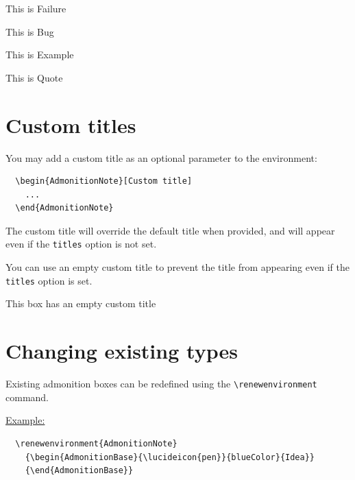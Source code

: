\documentclass{scrartcl}
\begin{document}
\begin{AdmonitionFailure}
This is Failure
\end{AdmonitionFailure}

\begin{AdmonitionBug}
This is Bug
\end{AdmonitionBug}

\begin{AdmonitionExample}
This is Example
\end{AdmonitionExample}

\begin{AdmonitionQuote}
This is Quote
\end{AdmonitionQuote}


\section{Custom titles}

You may add a custom title as an optional parameter to the environment:

\begin{verbatim}
  \begin{AdmonitionNote}[Custom title]
    ...
  \end{AdmonitionNote}
\end{verbatim}

The custom title will override the default title when provided, and will
appear even if the \texttt{titles} option is not set.

\begin{AdmonitionTip}[Tip]
You can use an empty custom title to prevent the title from appearing even if
the \texttt{titles} option is set.
\end{AdmonitionTip}

\begin{AdmonitionCaution}[]
This box has an empty custom title
\end{AdmonitionCaution}


\section{Changing existing types}

Existing admonition boxes can be redefined using the \verb|\renewenvironment|
command.

\underline{Example:}

\begin{verbatim}
  \renewenvironment{AdmonitionNote}
    {\begin{AdmonitionBase}{\lucideicon{pen}}{blueColor}{Idea}}
    {\end{AdmonitionBase}}
\end{verbatim}
\end{document}

